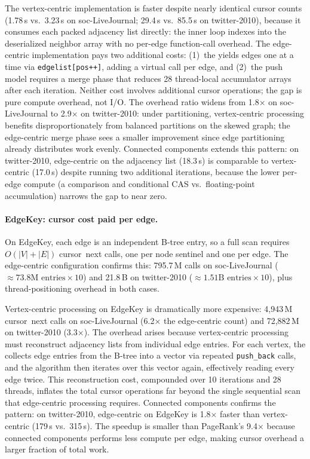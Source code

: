 The vertex-centric implementation is faster despite nearly identical cursor counts (1.78\,s vs.\ 3.23\,s on soc-LiveJournal; 29.4\,s vs.\ 85.5\,s on twitter-2010), because it consumes each packed adjacency list directly: the inner loop indexes into the deserialized neighbor array with no per-edge function-call overhead.
The edge-centric implementation pays two additional costs: (1)~the  yields edges one at a time via \texttt{edgelist[pos{+}{+}]}, adding a virtual call per edge, and (2)~the push model requires a merge phase that reduces 28 thread-local accumulator arrays after each iteration.
Neither cost involves additional cursor operations; the gap is pure compute overhead, not I/O.
The overhead ratio widens from 1.8$\times$ on soc-LiveJournal to 2.9$\times$ on twitter-2010: under  partitioning, vertex-centric processing benefits disproportionately from balanced partitions on the skewed graph; the edge-centric merge phase sees a smaller improvement since edge partitioning already distributes work evenly.
Connected components extends this pattern: on twitter-2010, edge-centric on the adjacency list (18.3\,s) is comparable to vertex-centric (17.0\,s) despite running two additional iterations, because the lower per-edge compute (a comparison and conditional \ac{CAS} vs.\ floating-point accumulation) narrows the gap to near zero.

\paragraph{EdgeKey: cursor cost paid per edge.}
On EdgeKey, each edge is an independent B-tree entry, so a full scan requires $O(|V| + |E|)$ cursor~next calls, one per node sentinel and one per edge.
The edge-centric configuration confirms this: 795.7\,M calls on soc-LiveJournal ($\approx 73.8\text{M entries} \times 10$) and 21.8\,B on twitter-2010 ($\approx 1.51\text{B entries} \times 10$), plus thread-positioning overhead in both cases.

Vertex-centric processing on EdgeKey is dramatically more expensive: 4{,}943\,M cursor~next calls on soc-LiveJournal (6.2$\times$ the edge-centric count) and 72{,}882\,M on twitter-2010 (3.3$\times$).
The overhead arises because vertex-centric processing must reconstruct adjacency lists from individual edge entries.
For each vertex, the  collects edge entries from the B-tree into a vector via repeated \texttt{push\_back} calls, and the algorithm then iterates over this vector again, effectively reading every edge twice.
This reconstruction cost, compounded over 10 iterations and 28 threads, inflates the total cursor operations far beyond the single sequential scan that edge-centric processing requires.
Connected components confirms the pattern: on twitter-2010, edge-centric on EdgeKey is 1.8$\times$ faster than vertex-centric (179\,s vs.\ 315\,s).
The speedup is smaller than PageRank's 9.4$\times$ because connected components performs less compute per edge, making cursor overhead a larger fraction of total work.

